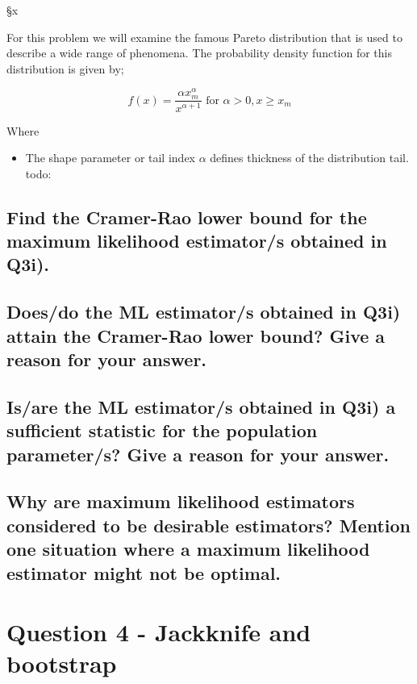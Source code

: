 §x\documentclass[]{article}
\begin{document}
For this problem we will examine the famous Pareto distribution that is used to describe a wide range of phenomena. The probability density function for this distribution is given by;

$$
f(x) = \frac{\alpha x_{m}^{\alpha}}{x^{\alpha+1}} \text{   for  }\alpha > 0, x\ge x_m
$$

Where
\begin{itemize}
	\item The shape parameter or tail index $\alpha$ defines thickness of the distribution tail. 
	todo:
\end{itemize}








\subsection{Find the Cramer-Rao lower bound for the maximum likelihood estimator/s obtained in Q3i).}

\subsection{Does/do the ML estimator/s obtained in Q3i) attain the Cramer-Rao lower bound?  Give a reason for your answer. }

\subsection{Is/are the ML estimator/s obtained in Q3i) a sufficient statistic for the population parameter/s?  Give a reason for your answer.}

\subsection{Why are maximum likelihood estimators considered to be desirable estimators?  Mention one situation where a maximum likelihood estimator might not be optimal.   }


\section{Question 4 - Jackknife and bootstrap}
\end{document}
